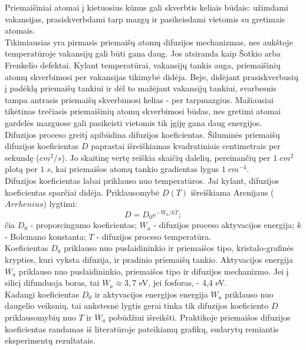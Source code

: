 \documentclass[11pt,a4paper]{article}
\begin{document}
Priemaišiniai atomai į kietuosius kūnus gali skverbtis keliais būdais: užimdami vakansijas, prasiskverbdami tarp mazgų ir pasikeisdami vietomis su gretimais atomais.\\

Tikimiausias yra pirmasis priemaišų atomų difuzijos mechanizmas, nes aukštoje temperatūroje vakansijų gali būti gana daug. 
Jos atsiranda kaip Šotkio arba Frenkelio defektai. Kylant temperatūrai, vakansijų tankis auga, priemaišinių atomų skverbimosi per 
vakansijas tikimybė didėja. Beje, didėjant prasiskverbusių į padėklą priemaišų tankiui ir dėl to mažėjant vakansijų tankiui, svarbesnis 
tampa antrasis priemaišų skverbimosi kelias - per tarpmazgius. Mažiausiai tikėtinas trečiasis priemaišinių atomų skverbimosi būdas, nes 
gretimi atomai gardelės mazguose gali pasikeisti vietomis tik įgiję gana daug energijos.\\

Difuzijos proceso greitį apibūdina difuzijos koeficientas. Šiluminės priemaišų difuzijos koeficientas $D$ paprastai išreiškiamas 
kvadratiniais centimetrais per sekundę ($cm^2/s$). Jo skaitinę vertę reiškia skaičių dalelių, pereinančių per $1\;cm^2$ plotą 
per $1\;s$, kai priemaišos atomų tankio gradientas lygus $1\;cm^{-4}$.\\

Difuzijos koeficientas labai priklauso nuo temperatūros. Jai kylant, difuzijos koeficientas sparčiai didėja. 
Priklausomybė $D(T)$ išreiškiama Arenijaus ($Arrhenius$) lygtimi:\\

\begin{equation}
  D = D_0 e^{-W_a/kT};
\end{equation}
čia $D_0$ - proporcingumo koeficientas; $W_a$ - difuzijos proceso aktyvacijos energija; $k$ - Bolcmano konstanta; $T$ - difuzijos proceso temperatūra.\\

Koeficientas $D_0$ priklauso nuo puslaidininkio ir priemaišos tipo, kristalo-grafinės krypties, 
kuri vyksta difuzija, ir pradinio priemaišų tankio. Aktyvacijos energija $W_a$ priklauso nuo puslaidininkio, 
priemaišos tipo ir difuzijos mechanizmo. Jei į silicį difunduoja boras, tai $W_a \approx 3,7$ eV, jei fosforas, - 4,4 eV.\\

Kadangi koeficientas $D_0$ ir aktyvacijos energijos energija $W_a$ priklauso nuo daugelio veiksnių, 
tai ankstesnė lygtis gerai tinka tik difuzijos koeficiento $D$ priklausomybių nuo $T$ ir $W_a$ pobūdžiui išreikšti. 
Praktikoje priemaišos difuzijos koeficientas randamas iš literatūroje pateikiamų grafikų, sudarytų remiantis eksperimentų rezultatais.
\end{document}
